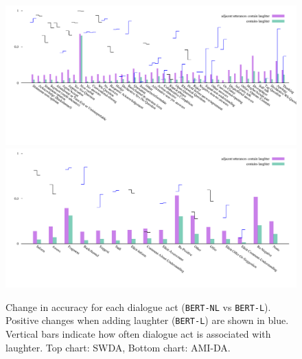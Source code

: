 \documentclass[11pt,a4paper]{article}
\begin{document}
\begin{figure}[h!]
  \centering
  \includegraphics[width=\linewidth]{img/SWDA-bertLvsNL.pdf}
  \includegraphics[width=\linewidth]{img/AMI-DA-bertLvsNL.pdf}
  \caption{Change in accuracy for each dialogue act (\texttt{BERT-NL} vs \texttt{BERT-L}). Positive changes when adding laughter (\texttt{BERT-L}) are shown in blue. Vertical bars indicate how often dialogue act is associated with laughter. Top chart: SWDA, Bottom chart: AMI-DA. }
    \label{fig:by-da}
  \end{figure}
\end{document}
